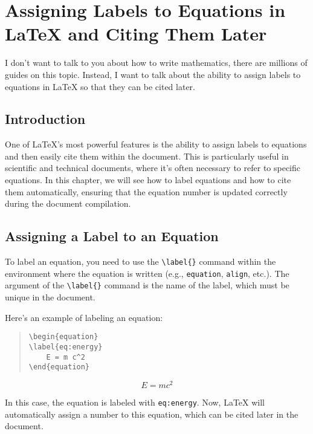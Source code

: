 \chapter[Advanced Mathematics]{Assigning Labels to Equations in LaTeX and Citing Them Later}

I don't want to talk to you about how to write mathematics, there are millions of guides on this topic. Instead, I want to talk about the ability to assign labels to equations in LaTeX so that they can be cited later.

\section{Introduction}

One of LaTeX's most powerful features is the ability to assign labels to equations and then easily cite them within the document. This is particularly useful in scientific and technical documents, where it's often necessary to refer to specific equations. In this chapter, we will see how to label equations and how to cite them automatically, ensuring that the equation number is updated correctly during the document compilation.

\section{Assigning a Label to an Equation}

To label an equation, you need to use the \verb|\label{}| command within the environment where the equation is written (e.g., \verb|equation|, \verb|align|, etc.). The argument of the \verb|\label{}| command is the name of the label, which must be unique in the document.

Here's an example of labeling an equation:
\begin{quote}
\begin{verbatim}
\begin{equation}
\label{eq:energy}
    E = m c^2
\end{equation}
\end{verbatim}
\end{quote}

\begin{equation}
\label{eq:energy}
    E = m c^2
\end{equation}

In this case, the equation is labeled with \texttt{eq:energy}. Now, LaTeX will automatically assign a number to this equation, which can be cited later in the document.

